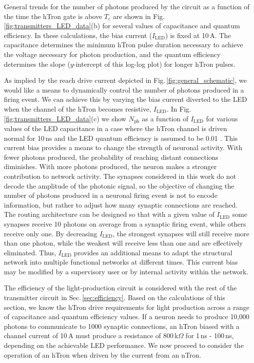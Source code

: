 \documentclass[twocolumn]{article}
\begin{document}
General trends for the number of photons produced by the circuit as a function of the time the hTron gate is above $T_{\mathrm{c}}$ are shown in Fig.\,\ref{fig:transmitters_LED_data}(b) for several values of capacitance and quantum efficiency. In these calculations, the bias current ($I_{\mathrm{LED}}$) is fixed at 10\,\textmu A. The capacitance determines the minimum hTron pulse duration necessary to achieve the voltage necessary for photon production, and the quantum efficiency determines the slope ($y$-intercept of this log-log plot) for longer hTron pulses.

As implied by the reach drive current depicted in Fig.\,\ref{fig:general_schematic}, we would like a means to dynamically control the number of photons produced in a firing event. We can achieve this by varying the bias current diverted to the LED when the channel of the hTron becomes resistive, $I_{\mathrm{LED}}$. In Fig.\,\ref{fig:transmitters_LED_data}(c) we show $N_{\mathrm{ph}}$ as a function of $I_{\mathrm{LED}}$ for various values of the LED capacitance in a case where the hTron channel is driven normal for 10\,ns and the LED quantum efficiency is assumed to be 0.01 \cite{doro2017}. This current bias provides a means to change the strength of neuronal activity. With fewer photons produced, the probability of reaching distant connections diminishes. With more photons produced, the neuron makes a stronger contribution to network activity. The synapses considered in this work do not decode the amplitude of the photonic signal, so the objective of changing the number of photons produced in a neuronal firing event is not to encode information, but rather to adjust how many synaptic connections are reached. The routing architecture can be designed so that with a given value of $I_{\mathrm{LED}}$ some synapses receive 10 photons on average from a synaptic firing event, while others receive only one. By decreasing $I_{\mathrm{LED}}$, the strongest synapses will still receive more than one photon, while the weakest will receive less than one and are effectively eliminated. Thus, $I_{\mathrm{LED}}$ provides an additional means to adapt the structural network into multiple functional networks at different times. This current bias may be modified by a supervisory user or by internal activity within the network.

The efficiency of the light-production circuit is considered with the rest of the transmitter circuit in Sec.\,\ref{sec:efficiency}. Based on the calculations of this section, we know the hTron drive requirements for light production across a range of capacitance and quantum efficiency values. If a neuron needs to produce 10,000 photons to communicate to 1000 synaptic connections, an hTron biased with a channel current of 10\,\textmu A must produce a resistance of 800\,k$\Omega$ for 1\,ns - 100\,ns, depending on the achievable LED performance. We now proceed to consider the operation of an hTron when driven by the current from an nTron.  
	
\end{document}
